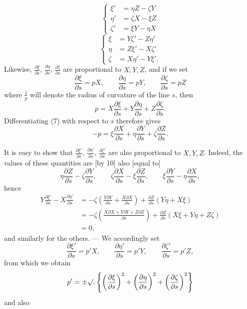 %
\begin{equation}
\left\{\begin{aligned}\xi'&=\eta Z-\zeta Y\\\eta'&=\zeta X-\xi Z\\\zeta'&=\xi Y-\eta X\end{aligned}\right.\tag*{[10]}
\end{equation}
\begin{equation}
\left\{\begin{aligned}\xi&=Y\zeta'-Z\eta'\\\eta&=Z\xi'-X\zeta'\\\zeta&=X\eta'-Y\xi'.\end{aligned}\right.\tag*{[11]}
\end{equation}
\indent Likewise, $\frac{\partial\xi}{\partial s}$, $\frac{\partial\eta}{\partial s}$, $\frac{\partial\zeta}{\partial s}$ are proportional to $X,Y,Z$, and if we set
\[
\frac{\partial\xi}{\partial s}=pX,\qquad\frac{\partial\eta}{\partial s}=pY,\qquad\frac{\partial\zeta}{\partial s}=pZ
\]
where $\frac1p$ will denote the radius of curvature of the line $s$, then
\[
p=X\frac{\partial\xi}{\partial s}+Y\frac{\partial\eta}{\partial s}+Z\frac{\partial\zeta}{\partial s}.
\]
Differentiating (7) with respect to $s$ therefore gives
\[
-p=\xi\frac{\partial X}{\partial s}+\eta\frac{\partial Y}{\partial s}+\zeta\frac{\partial Z}{\partial s}.
\]

It is easy to show that $\frac{\partial\xi'}{\partial s}$, $\frac{\partial\eta'}{\partial s}$, $\frac{\partial\zeta'}{\partial s}$ are also proportional to $X,Y,Z$. Indeed, the values of these quantities are [by 10] also [equal to]
\[
\eta\frac{\partial Z}{\partial s}-\zeta\frac{\partial Y}{\partial s},\qquad\zeta\frac{\partial X}{\partial s}-\xi\frac{\partial Z}{\partial s},\qquad\xi\frac{\partial Y}{\partial s}-\eta\frac{\partial X}{\partial s},
\]
hence
\[
\begin{aligned}
Y\frac{\partial\xi'}{\partial s}-X\frac{\partial\eta'}{\partial s}&=-\zeta\left(\frac{Y\partial Y}{\partial s}+\frac{X\partial X}{\partial s}\right)+\frac{\partial Z}{\partial s}(Y\eta+X\xi)\\
&=-\zeta\left(\frac{X\partial X+Y\partial Y+Z\partial Z}{\partial s}\right)+\frac{\partial Z}{\partial s}(X\xi+Y\eta+Z\zeta)\\
&=0,
\end{aligned}
\]
and similarly for the others. — We accordingly set
\[
\frac{\partial\xi'}{\partial s}=p'X,\qquad\frac{\partial\eta'}{\partial s}=p'Y,\qquad\frac{\partial\zeta'}{\partial s}=p'Z,
\]
from which we obtain
\[
p'=\pm\mathord{\surd}.\left\{\left(\frac{\partial\xi}{\partial s}\right)^{2}+\left(\frac{\partial\eta}{\partial s}\right)^{2}+\left(\frac{\partial\zeta}{\partial s}\right)^{2}\right\}
\]
and also
